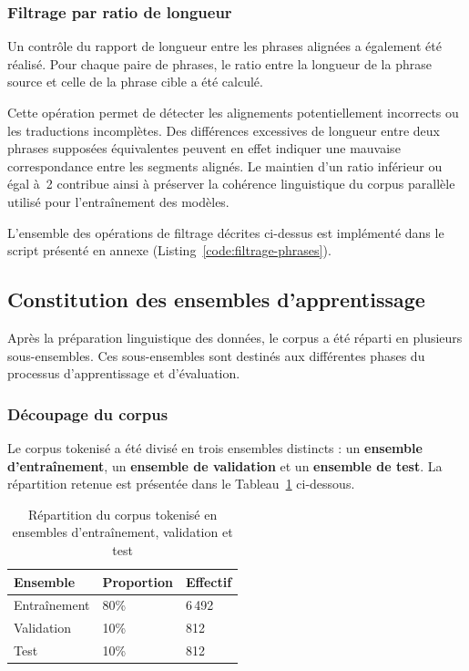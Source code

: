 \subsubsection{Filtrage par ratio de longueur}

Un contrôle du rapport de longueur entre les phrases alignées a également été réalisé. Pour chaque paire de phrases, le ratio entre la longueur de la phrase source et celle de la phrase cible a été calculé.

Cette opération permet de détecter les alignements potentiellement incorrects ou les traductions incomplètes. Des différences excessives de longueur entre deux phrases supposées équivalentes peuvent en effet indiquer une mauvaise correspondance entre les segments alignés. Le maintien d'un ratio inférieur ou égal à~2 contribue ainsi à préserver la cohérence linguistique du corpus parallèle utilisé pour l'entraînement des modèles.

L'ensemble des opérations de filtrage décrites ci-dessus est implémenté dans le script présenté en annexe (Listing~\ref{code:filtrage-phrases}).

\subsection{Constitution des ensembles d'apprentissage}
\label{subsec:constitution_ensembles}

Après la préparation linguistique des données, le corpus a été réparti en plusieurs sous-ensembles. Ces sous-ensembles sont destinés aux différentes phases du processus d'apprentissage et d'évaluation.

\subsubsection{Découpage du corpus}
\label{subsubsec:decoupage_corpus}

Le corpus tokenisé a été divisé en trois ensembles distincts : un \textbf{ensemble d'entraînement}, un \textbf{ensemble de validation} et un \textbf{ensemble de test}. La répartition retenue est présentée dans le Tableau~\ref{tab:decoupage_corpus} ci-dessous.

\begin{table}[H]
\centering
\renewcommand{\arraystretch}{1.5}
\begin{tabular}{p{4.0cm}p{3.2cm}p{3.2cm}}
\toprule
\textbf{Ensemble} & \textbf{Proportion} & \textbf{Effectif} \\
\midrule
Entraînement & 80\% & 6\,492 \\
Validation & 10\% & 812 \\
Test & 10\% & 812 \\
\bottomrule
\end{tabular}
\caption{Répartition du corpus tokenisé en ensembles d'entraînement, validation et test}
\label{tab:decoupage_corpus}
\end{table}

